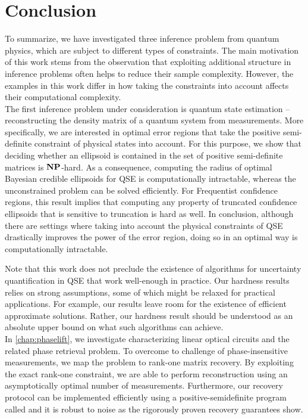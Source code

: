 
\chapter{Conclusion}%
\label{chap:conclusion}

To summarize, we have investigated three inference problem from quantum physics, which are subject to different types of constraints.
The main motivation of this work stems from the observation that exploiting additional structure in inference problems often helps to reduce their sample complexity.
However, the examples in this work differ in how taking the constraints into account affects their computational complexity.\\



The first inference problem under consideration is quantum state estimation -- reconstructing the density matrix of a quantum system from measurements.
More specifically, we are interested in optimal error regions that take the positive semi-definite constraint of physical states into account.
For this purpose, we show that deciding whether an ellipsoid is contained in the set of positive semi-definite matrices is $\mathbf{NP}$-hard.
As a consequence, computing the radius of optimal Bayesian credible ellipsoids for QSE is computationally intractable, whereas the unconstrained problem can be solved efficiently.
For Frequentist confidence regions, this result implies that computing any property of truncated confidence ellipsoids that is sensitive to truncation is hard as well.
In conclusion, although there are settings where taking into account the physical constraints of QSE drastically improves the power of the error region, doing so in an optimal way is computationally intractable.

Note that this work does not preclude the existence of algorithms for uncertainty quantification in QSE that work well-enough in practice.
Our hardness results relies on strong assumptions, some of which might be relaxed for practical applications.
For example, our results leave room for the existence of efficient approximate solutions.
Rather, our hardness result should be understood as an absolute upper bound on what such algorithms can achieve.\\


In \cref{chap:phaselift}, we investigate characterizing linear optical circuits and the related phase retrieval problem.
To overcome to challenge of phase-insensitive measurements, we map the problem to rank-one matrix recovery.
By exploiting the exact rank-one constraint, we are able to perform reconstruction using an asymptotically optimal number of measurements.
Furthermore, our recovery protocol can be implemented efficiently using a positive-semidefinite program called  and it is robust to noise as the rigorously proven recovery guarantees show.

